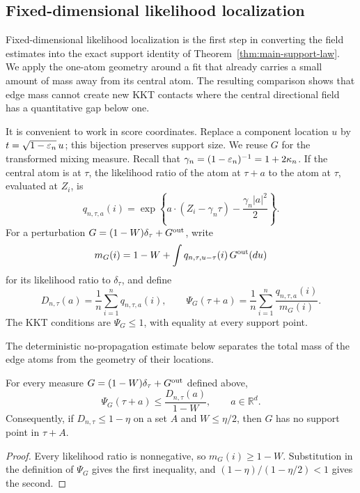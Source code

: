 \subsection{Fixed-dimensional likelihood localization}
\label{sec:support-likelihood-localization}

Fixed-dimensional likelihood localization is the first step in converting
the field estimates into the exact support identity of
Theorem~\ref{thm:main-support-law}. We apply the one-atom
geometry around a fit that already carries a small amount of mass away from
its central atom. The resulting comparison shows that edge mass cannot create
new KKT contacts where the central directional field has a quantitative gap
below one.

It is convenient to work in score coordinates. Replace a component location
\(u\) by \(t=\sqrt{1-\varepsilon_n}\,u\); this bijection preserves support size.
We reuse \(G\) for the transformed mixing measure. Recall that
\(\gamma_n=(1-\varepsilon_n)^{-1}=1+2\kappa_n\). If the central atom is at
\(\tau\), the likelihood ratio of the atom at \(\tau+a\) to the atom at
\(\tau\), evaluated at \(Z_i\), is
\[
    q_{n,\tau,a}(i)
    =\exp\left\{a\cdot(Z_i-\gamma_n\tau)
                    -\frac{\gamma_n|a|^2}{2}\right\}.
\]
For a perturbation \(G=(1-W)\delta_\tau+G^{\rm out}\), write
\[
    m_G(i)
    =1-W+\int q_{n,\tau,u-\tau}(i)\,G^{\rm out}(du)
\]
for its likelihood ratio to \(\delta_\tau\), and define
\[
    D_{n,\tau}(a)=\frac1n\sum_{i=1}^nq_{n,\tau,a}(i),
    \qquad
    \Psi_G(\tau+a)=\frac1n\sum_{i=1}^n
        \frac{q_{n,\tau,a}(i)}{m_G(i)}.
\]
The KKT conditions are \(\Psi_G\le1\), with equality at every support point.

The deterministic no-propagation estimate below separates the total mass of
the edge atoms from the geometry of their locations.
\begin{lemma}
\label{lem:support-no-percolation}
For every measure \(G=(1-W)\delta_\tau+G^{\rm out}\) defined above,
\[
    \Psi_G(\tau+a)\le \frac{D_{n,\tau}(a)}{1-W},
    \qquad a\in\mathbb R^d.
\]
Consequently, if \(D_{n,\tau}\le1-\eta\) on a set \(A\) and
\(W\le\eta/2\), then \(G\) has no support point in \(\tau+A\).
\end{lemma}

\begin{proof}
Every likelihood ratio is nonnegative, so \(m_G(i)\ge1-W\). Substitution in
the definition of \(\Psi_G\) gives the first inequality, and
\((1-\eta)/(1-\eta/2)<1\) gives the second. \qedhere
\end{proof}

